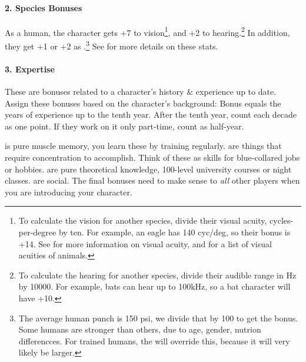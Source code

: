 
\paragraph*{2. Species Bonuses}
As a human, the character gets +7 to vision\footnote{
	To calculate the vision for another species, divide their visual acuity, cycles-per-degree by ten.
	For example, an eagle has 140 cyc/deg, so their bonus is +14.
	See \cite{caves_acuityview_2018} for more information on visual acuity,
	and \cite{noauthor_list_2019} for a list of visual acuities of animals.
},
and +2 to hearing.\footnote{
	To calculate the hearing for another species, divide their audible range in Hz by 10000.
	For example, bats can hear up to 100kHz, so a bat character will have +10.
}
In addition, they get +1 or +2 as .\footnote{
	The average human punch is 150 psi, we divide that by 100 to get the bonus.
	Some humans are stronger than others, due to age, gender, nutrion differencces.
	For trained humans, the  will override this, because it will
	very likely be larger.
}
See  for more details on these stats.




\paragraph*{3. Expertise}

\begin{marginNote}
	
\end{marginNote}
These are bonuses related to a character's history \& experience up to date.
Assign these bonuses based on the character's background:
Bonus equals the years of experience up to the tenth year.
After the tenth year, count each decade as one point.
If they work on it only part-time, count as half-year.\par
{} is pure muscle memory, you learn these by training regularly.
 are things that require concentration to accomplish. Think of these as skills for blue-collared jobs or hobbies.
 are pure theoretical knowledge, 100-level university courses or night classes.
 are social.
The final bonuses need to make sense to \emph{all} other players when you are introducing your character.\par

